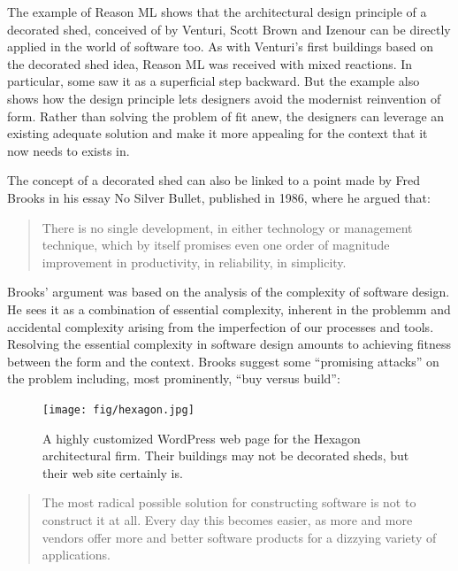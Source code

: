 The example of Reason ML shows that the architectural design principle of a decorated shed,
conceived of by Venturi, Scott Brown and Izenour can be directly applied in the world of software
too. As with Venturi's first buildings based on the decorated shed idea, Reason ML was received with
mixed reactions. In particular, some saw it as a superficial step backward. But the example also
shows how the design principle lets designers avoid the modernist reinvention of form. Rather than
solving the problem of fit anew, the designers can leverage an existing adequate solution and make
it more appealing for the context that it now needs to exists in.

The concept of a decorated shed can also be linked to a point made by Fred Brooks in his essay
No Silver Bullet, published in 1986, where he argued that:

\begin{quote}
There is no single development, in either technology or management technique, which by itself
promises even one order of magnitude improvement in productivity, in reliability, in
simplicity.
\end{quote}

Brooks' argument was based on the analysis of the complexity of software design. He sees it as a
combination of essential complexity, inherent in the problemm and accidental complexity arising
from the imperfection of our processes and tools. Resolving the essential complexity in software
design amounts to achieving fitness between the form and the context. Brooks suggest
some ``promising attacks'' on the problem including, most prominently, ``buy versus build'':

\begin{figure}
  \centering
  \texttt{[image: fig/hexagon.jpg]}
  \caption{A highly customized WordPress web page for the Hexagon architectural firm. Their
  buildings may not be decorated sheds, but their web site certainly is.}
  \label{fig:wordpress}
\end{figure}

\begin{quote}
The most radical possible solution for constructing software is not to construct it at all.
Every day this becomes easier, as more and more vendors offer more and better software products
for a dizzying variety of applications.
\end{quote}

